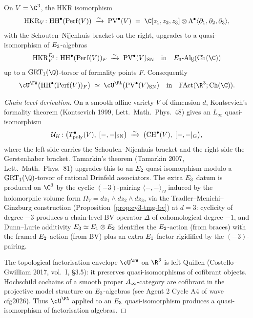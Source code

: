 \begin{proposition}
\label{prop:r6-hkr-e3-envelope-c3}
On $V = \C^3$, the HKR isomorphism
\[
\mathrm{HKR}_V \colon \HH^\bullet(\Perf(V))
\;\xrightarrow{\sim}\;
\PV^\bullet(V) \;=\; \C[z_1,z_2,z_3]\otimes\Lambda^\bullet\langle\partial_1,\partial_2,\partial_3\rangle,
\]
with the Schouten--Nijenhuis bracket on the right, upgrades to a
quasi-isomorphism of $E_3$-algebras
\[
\mathrm{HKR}_V^{\Ethree}\colon
\HH^\bullet(\Perf(V))_F
\;\xrightarrow{\sim}\;
\PV^\bullet(V)_{\mathrm{SN}}
\quad\text{in}\quad \Ethree\text{-}\mathrm{Alg}(\mathrm{Ch}(\C))
\]
up to a $\GRT_1(\Q)$-torsor of formality points $F$.  Consequently
\[
\cU^\FA\bigl(\HH^\bullet(\Perf(V))_F\bigr)
\;\simeq\;
\cU^\FA\bigl(\PV^\bullet(V)_{\mathrm{SN}}\bigr)
\quad\text{in}\quad \mathrm{FAct}(\R^3;\mathrm{Ch}(\C)).
\]
\end{proposition}

\begin{proof}[Chain-level derivation]
On a smooth affine variety $V$ of dimension $d$, Kontsevich's formality
theorem (Kontsevich 1999, Lett.~Math.~Phys.~48) gives an $L_\infty$
quasi-isomorphism
\[
\mathcal U_K\colon
\bigl(T^\bullet_{\mathrm{poly}}(V),\;[-,-]_{\mathrm{SN}}\bigr)
\;\xrightarrow{\sim}\;
\bigl(\mathrm{CH}^\bullet(V),\;[-,-]_{\mathrm G}\bigr),
\]
where the left side carries the Schouten--Nijenhuis bracket and the
right side the Gerstenhaber bracket. Tamarkin's theorem (Tamarkin 2007,
Lett.~Math.~Phys.~81) upgrades this to an $E_2$-quasi-isomorphism
modulo a $\GRT_1(\Q)$-torsor of rational Drinfeld associators.
The extra $E_3$ datum is produced on $\C^3$ by the cyclic
$(-3)$-pairing $\langle-,-\rangle_{\Omega}$ induced by the holomorphic
volume form $\Omega_V = dz_1\wedge dz_2\wedge dz_3$, via the
Tradler--Menichi--Ginzburg construction (Proposition~\ref{prop:cy3-tmg-bv})
at $d=3$: cyclicity of degree $-3$ produces a chain-level BV operator
$\Delta$ of cohomological degree $-1$, and Dunn--Lurie additivity
$E_3 \simeq E_1\otimes E_2$ identifies the $E_2$-action
(from braces) with the framed $E_2$-action (from BV) plus an extra
$E_1$-factor rigidified by the $(-3)$-pairing.

The topological factorisation envelope $\cU^\FA$ on $\R^3$ is left
Quillen (Costello--Gwilliam 2017, vol.~I, \S 3.5): it preserves
quasi-isomorphisms of cofibrant objects. Hochschild cochains of a
smooth proper $A_\infty$-category are cofibrant in the projective model
structure on $E_3$-algebras (see Agent 2 Cycle A4 of wave cfg2026).
Thus $\cU^\FA$ applied to an $E_3$ quasi-isomorphism produces a
quasi-isomorphism of factorisation algebras.
\end{proof}

